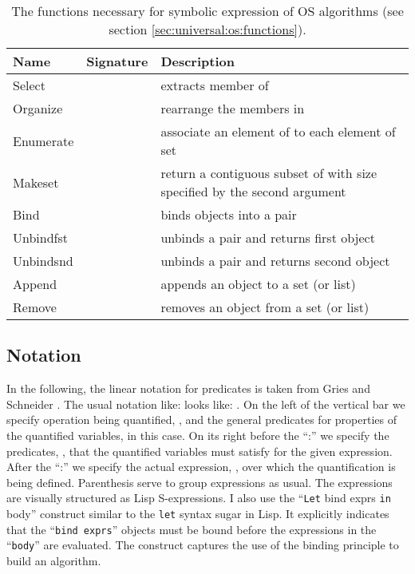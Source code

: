 \documentclass[draft]{article}
\begin{document}
\begin{table}[t]
  \begin{center}
    \begin{tabular}{|l|l|l|}
      \hline 
      \textbf{Name} & \textbf{Signature} & \textbf{Description} \\
      \hline 
      Select &  &
      extracts  member  of  \\
      Organize &  & rearrange the members in  \\
      Enumerate &   &
      associate  an element  of   to  each element of set  \\
      Makeset &  & 
      \parbox[t]{.4\textwidth}{return a
        contiguous subset of  with size specified by the second
        argument} \\
      Bind &  & binds objects 
      into a pair  \\
      Unbindfst &  & unbinds a pair 
      and returns first object  \\
      Unbindsnd &  & unbinds a pair 
      and returns second object  \\
      Append &  & appends an object  to a
      set (or list)  \\
      Remove &  & removes an object  from
      a set (or list)  \\
      \hline 
    \end{tabular}
  \end{center}
  \caption[Functions necessary for an OS]{The functions necessary for
    symbolic expression of OS algorithms (see section
    \ref{sec:universal:os:functions}).}
  \label{tab:os:functions}
\end{table}

\subsection{Notation}
\label{sec:notation}

In the  following, the  linear notation for  predicates is  taken from
Gries and Schneider  \cite{Gries:1993:LAD:161182}.  The usual notation
like:    looks like:  .  On  the left of the
vertical  bar we  specify  operation being  quantified,  , and  the
general predicates for properties  of the quantified variables,  in
this case.  On  its right before the ``:''  we specify the predicates,
, that  the quantified variables must  satisfy for the
given expression.   After the ``:'' we specify  the actual expression,
, over  which the quantification is  being defined.  Parenthesis
serve  to group expressions  as usual.   The expressions  are visually
structured  as  Lisp S-expressions.   I  also  use the  ``\texttt{Let}
bind   exprs   \texttt{in}  body''
construct  similar  to the  \texttt{let}  syntax  sugar  in Lisp.   It
explicitly indicates that the  ``\texttt{bind exprs}'' objects must be
bound before  the expressions in the  ``\texttt{body}'' are evaluated.
The construct  captures the use of  the binding principle  to build an
algorithm.
\end{document}

